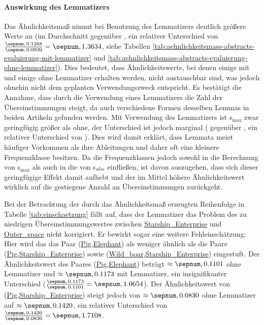 \paragraph{Auswirkung des Lemmatizers}
Das Ähnlichkeitsmaß nimmt bei Benutzung des Lemmatizers deutlich größere Werte an (im Durchschnitt  gegenüber , ein relativer Unterschied von $\frac{\val{0.1268}}{\val{0.0930}} = \val{1.3634}$,
 siehe Tabellen \ref{tab:aehnlichkeitsmass-abstracts-evaluierung-mit-lemmatizer} und \ref{tab:aehnlichkeitsmass-abstracts-evaluierung-ohne-lemmatizer}).
Dies bedeutet, dass Ähnlichkeitswerte, bei denen einige mit und einige ohne Lemmatizer erhalten werden, nicht austauschbar sind, was jedoch ohnehin nicht dem geplanten Verwendungszweck entspricht.
Es bestätigt die Annahme, dass durch die Verwendung eines Lemmatizers die Zahl der Übereinstimmungen steigt, da auch verschiedene Formen desselben Lemmas in beiden Artikeln gefunden werden.
Mit Verwendung des Lemmatizers ist s$_{\max}$ zwar geringfügig größer als ohne, der Unterschied ist jedoch marginal ( gegenüber , ein relativer Unterschied von ).
Dies wird damit erklärt, dass Lemmata meist häufiger Vorkommen als ihre Ableitungen und daher oft
eine kleinere Frequenzklasse besitzen. Da die Frequenzklassen jedoch sowohl in die Berechnung von s$_{\max}$ als auch in die von s$_{\textnormal{abs}}$ einfließen, ist davon auszugehen, dass sich dieser geringfügige Effekt damit aufhebt
und der im Mittel höhere Ähnlichkeitswert wirklich auf die gestiegene Anzahl an Übereinstimmungen zurückgeht.

Bei der Betrachtung der durch das Ähnlichkeitsmaß erzeugten Reihenfolge in Tabelle \ref{tab:einschaetzung} fällt auf, dass 
der Lemmatizer das Problem des zu niedrigen Übereinstimmungswertes zwischen \url{Starship_Enterprise} und \url{Outer_space} nicht korrigiert.
Er bewirkt sogar eine weitere Fehleinschätzung: Hier wird das das Paar (\url{Pig},\url{Elephant}) als weniger ähnlich
als die Paare (\url{Pig},\url{Starship_Enterprise}) sowie (\url{Wild_boar},\url{Starship_Enterprise}) eingestuft.
Der Ähnlichkeitswert des Paares (\url{Pig},\url{Elephant}) beträgt $\approx \val{0.1101}$ ohne Lemmatizer und $\approx \val{0.1173}$ mit Lemmatizer, ein insignifikanter Unterschied ($\frac{\val{0.1173}}{\val{0.1101}} = \val{1.0654}$).
Der Ähnlichkeitswert von (\url{Pig},\url{Starship_Enterprise}) steigt jedoch von $\approx \val{0.0830}$ ohne Lemmatizer auf $\approx \val{0.1420}$, ein relativer Unterschied von $\frac{\val{0.1420}}{\val{0.0830}} = \val{1.7108}$.

